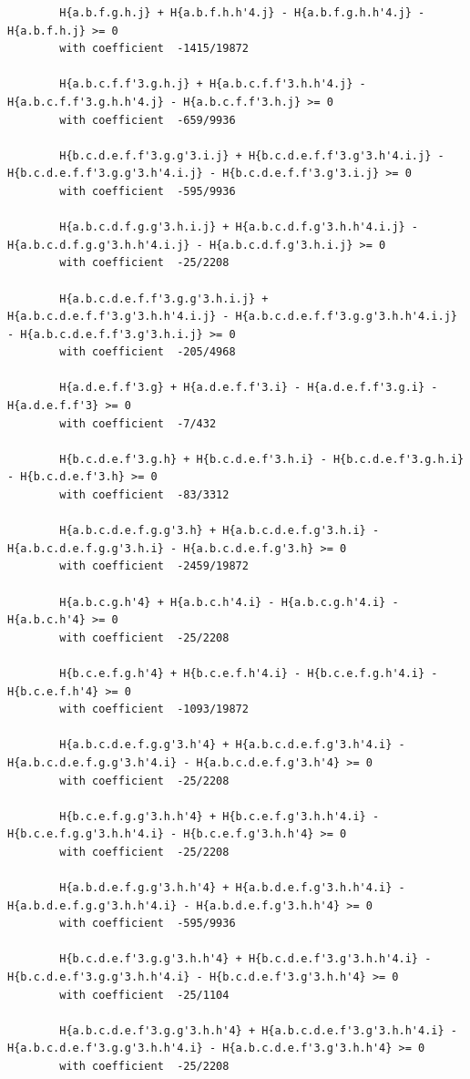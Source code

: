 \documentclass[11pt, a4paper]{kybernetika}
\begin{document}
\begin{verbatim}
		H{a.b.f.g.h.j} + H{a.b.f.h.h'4.j} - H{a.b.f.g.h.h'4.j} - H{a.b.f.h.j} >= 0
		with coefficient  -1415/19872
		
		H{a.b.c.f.f'3.g.h.j} + H{a.b.c.f.f'3.h.h'4.j} - H{a.b.c.f.f'3.g.h.h'4.j} - H{a.b.c.f.f'3.h.j} >= 0
		with coefficient  -659/9936
		
		H{b.c.d.e.f.f'3.g.g'3.i.j} + H{b.c.d.e.f.f'3.g'3.h'4.i.j} - H{b.c.d.e.f.f'3.g.g'3.h'4.i.j} - H{b.c.d.e.f.f'3.g'3.i.j} >= 0
		with coefficient  -595/9936
		
		H{a.b.c.d.f.g.g'3.h.i.j} + H{a.b.c.d.f.g'3.h.h'4.i.j} - H{a.b.c.d.f.g.g'3.h.h'4.i.j} - H{a.b.c.d.f.g'3.h.i.j} >= 0
		with coefficient  -25/2208
		
		H{a.b.c.d.e.f.f'3.g.g'3.h.i.j} + H{a.b.c.d.e.f.f'3.g'3.h.h'4.i.j} - H{a.b.c.d.e.f.f'3.g.g'3.h.h'4.i.j} - H{a.b.c.d.e.f.f'3.g'3.h.i.j} >= 0
		with coefficient  -205/4968
		
		H{a.d.e.f.f'3.g} + H{a.d.e.f.f'3.i} - H{a.d.e.f.f'3.g.i} - H{a.d.e.f.f'3} >= 0
		with coefficient  -7/432
		
		H{b.c.d.e.f'3.g.h} + H{b.c.d.e.f'3.h.i} - H{b.c.d.e.f'3.g.h.i} - H{b.c.d.e.f'3.h} >= 0
		with coefficient  -83/3312
		
		H{a.b.c.d.e.f.g.g'3.h} + H{a.b.c.d.e.f.g'3.h.i} - H{a.b.c.d.e.f.g.g'3.h.i} - H{a.b.c.d.e.f.g'3.h} >= 0
		with coefficient  -2459/19872
		
		H{a.b.c.g.h'4} + H{a.b.c.h'4.i} - H{a.b.c.g.h'4.i} - H{a.b.c.h'4} >= 0
		with coefficient  -25/2208
		
		H{b.c.e.f.g.h'4} + H{b.c.e.f.h'4.i} - H{b.c.e.f.g.h'4.i} - H{b.c.e.f.h'4} >= 0
		with coefficient  -1093/19872
		
		H{a.b.c.d.e.f.g.g'3.h'4} + H{a.b.c.d.e.f.g'3.h'4.i} - H{a.b.c.d.e.f.g.g'3.h'4.i} - H{a.b.c.d.e.f.g'3.h'4} >= 0
		with coefficient  -25/2208
		
		H{b.c.e.f.g.g'3.h.h'4} + H{b.c.e.f.g'3.h.h'4.i} - H{b.c.e.f.g.g'3.h.h'4.i} - H{b.c.e.f.g'3.h.h'4} >= 0
		with coefficient  -25/2208
		
		H{a.b.d.e.f.g.g'3.h.h'4} + H{a.b.d.e.f.g'3.h.h'4.i} - H{a.b.d.e.f.g.g'3.h.h'4.i} - H{a.b.d.e.f.g'3.h.h'4} >= 0
		with coefficient  -595/9936
		
		H{b.c.d.e.f'3.g.g'3.h.h'4} + H{b.c.d.e.f'3.g'3.h.h'4.i} - H{b.c.d.e.f'3.g.g'3.h.h'4.i} - H{b.c.d.e.f'3.g'3.h.h'4} >= 0
		with coefficient  -25/1104
		
		H{a.b.c.d.e.f'3.g.g'3.h.h'4} + H{a.b.c.d.e.f'3.g'3.h.h'4.i} - H{a.b.c.d.e.f'3.g.g'3.h.h'4.i} - H{a.b.c.d.e.f'3.g'3.h.h'4} >= 0
		with coefficient  -25/2208
		

\end{verbatim}
\end{document}
